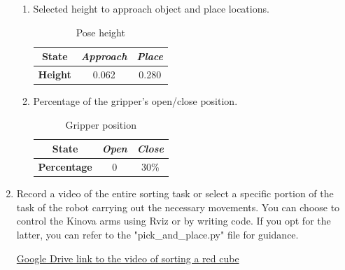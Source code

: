 \documentclass[12pt]{article}
\begin{document}
\begin{enumerate}
\begin{enumerate}
        \item Selected height to approach object and place locations.
        
        \begin{table}[H]
            \caption{Pose height}
            \centering
            \begin{tabular}{ccc}
                \toprule
                \textbf{State} & \textit{Approach} & \textit{Place} \\\midrule
                \textbf{Height} & 0.062 & 0.280 \\\bottomrule
            \end{tabular}
        \end{table}

        \item Percentage of the gripper’s open/close position.
        
        \begin{table}[H]
            \caption{Gripper position}
            \centering
            \begin{tabular}{ccc}
                \toprule
                \textbf{State} & \textit{Open} & \textit{Close} \\\midrule
                \textbf{Percentage} & 0 & 30\% \\\bottomrule
            \end{tabular}
        \end{table}
        
    \end{enumerate}
    
    \item Record a video of the entire sorting task or select a specific portion of the task of the robot carrying out the necessary movements. You can choose to control the Kinova arms using Rviz or by writing code. If you opt for the latter, you can refer to the "pick\_and\_place.py" file for guidance.
    
    \href{https://drive.google.com/file/d/1WHiMvIzTKDBX92PTeloq5f1X7C0vTkVE/view?usp=share_link}
    {Google Drive link to the video of sorting a red cube}

\end{enumerate}
\end{document}
